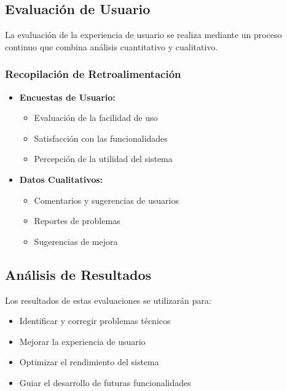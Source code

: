 \subsection{Evaluación de Usuario}
\label{evaluacion-usuario}

La evaluación de la experiencia de usuario se realiza mediante un proceso continuo que combina análisis cuantitativo y cualitativo.

\subsubsection{Recopilación de Retroalimentación}

\begin{itemize}
	\item \textbf{Encuestas de Usuario:}
	      \begin{itemize}
		      \item Evaluación de la facilidad de uso
		      \item Satisfacción con las funcionalidades
		      \item Percepción de la utilidad del sistema
	      \end{itemize}

	\item \textbf{Datos Cualitativos:}
	      \begin{itemize}
		      \item Comentarios y sugerencias de usuarios
		      \item Reportes de problemas
		      \item Sugerencias de mejora
	      \end{itemize}
\end{itemize}

\subsection{Análisis de Resultados}

Los resultados de estas evaluaciones se utilizarán para:

\begin{itemize}
	\item Identificar y corregir problemas técnicos
	\item Mejorar la experiencia de usuario
	\item Optimizar el rendimiento del sistema
	\item Guiar el desarrollo de futuras funcionalidades
\end{itemize}